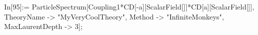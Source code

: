 In[95]:= ParticleSpectrum[Coupling1*CD[-a][ScalarField[]]*CD[a][ScalarField[]], TheoryName -> "MyVeryCoolTheory", Method -> "InfiniteMonkeys", MaxLaurentDepth -> 3]; 